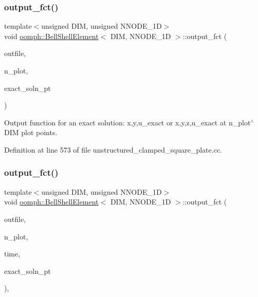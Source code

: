 \subsubsection{\texorpdfstring{output\+\_\+fct()}{output\_fct()}\hspace{0.1cm}{\footnotesize\ttfamily [1/2]}}
{\footnotesize\ttfamily template$<$unsigned D\+IM, unsigned N\+N\+O\+D\+E\+\_\+1D$>$ \\
void \hyperlink{classoomph_1_1BellShellElement}{oomph\+::\+Bell\+Shell\+Element}$<$ D\+IM, N\+N\+O\+D\+E\+\_\+1D $>$\+::output\+\_\+fct (\begin{DoxyParamCaption}\item[{std\+::ostream \&}]{outfile,  }\item[{const unsigned \&}]{n\+\_\+plot,  }\item[{Finite\+Element\+::\+Steady\+Exact\+Solution\+Fct\+Pt}]{exact\+\_\+soln\+\_\+pt }\end{DoxyParamCaption})\hspace{0.3cm}{\ttfamily [inline]}}



Output function for an exact solution\+: x,y,u\+\_\+exact or x,y,z,u\+\_\+exact at n\+\_\+plot$^\wedge$\+D\+IM plot points. 



Definition at line 573 of file unstructured\+\_\+clamped\+\_\+square\+\_\+plate.\+cc.

\mbox{\label{classoomph_1_1BellShellElement_a5589f860978d78c64278afdbc72f5f5d}} 
\subsubsection{\texorpdfstring{output\+\_\+fct()}{output\_fct()}\hspace{0.1cm}{\footnotesize\ttfamily [2/2]}}
{\footnotesize\ttfamily template$<$unsigned D\+IM, unsigned N\+N\+O\+D\+E\+\_\+1D$>$ \\
void \hyperlink{classoomph_1_1BellShellElement}{oomph\+::\+Bell\+Shell\+Element}$<$ D\+IM, N\+N\+O\+D\+E\+\_\+1D $>$\+::output\+\_\+fct (\begin{DoxyParamCaption}\item[{std\+::ostream \&}]{outfile,  }\item[{const unsigned \&}]{n\+\_\+plot,  }\item[{const double \&}]{time,  }\item[{Finite\+Element\+::\+Unsteady\+Exact\+Solution\+Fct\+Pt}]{exact\+\_\+soln\+\_\+pt }\end{DoxyParamCaption})\hspace{0.3cm}{\ttfamily [inline]}, {\ttfamily [virtual]}}



